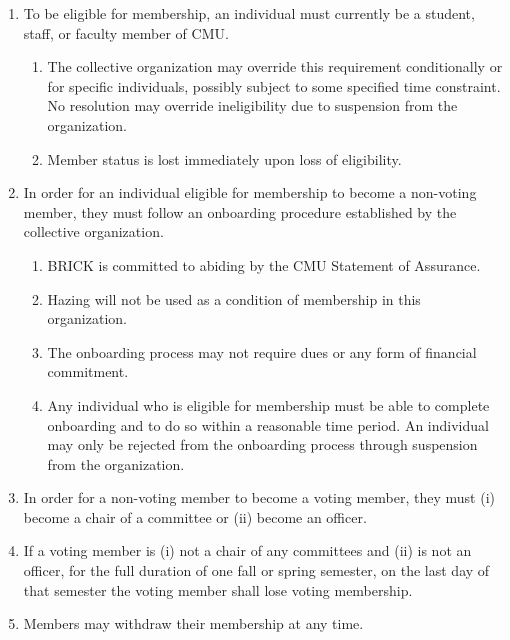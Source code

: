 \documentclass[11pt]{article}
\newcounter{h1}
\newcounter{h2}[h1]
\newcounter{h3}[h2]
\begin{document}
\begin{enumerate}
  \item To be eligible for membership, an individual must currently be a student, staff, or faculty member of CMU.
  \begin{enumerate}
    \item The collective organization may override this requirement conditionally or for specific individuals, possibly subject to some specified time constraint. No resolution may override ineligibility due to suspension from the organization.
    \item Member status is lost immediately upon loss of eligibility.
  \end{enumerate}
  \item In order for an individual eligible for membership to become a non-voting member, they must follow an onboarding procedure established by the collective organization.
  \begin{enumerate}
    \item BRICK is committed to abiding by the CMU Statement of Assurance.
    \item Hazing will not be used as a condition of membership in this organization.
    \item The onboarding process may not require dues or any form of financial commitment.
    \item Any individual who is eligible for membership must be able to complete onboarding and to do so within a reasonable time period. An individual may only be rejected from the onboarding process through suspension from the organization.
  \end{enumerate}
  \item In order for a non-voting member to become a voting member, they must (i) become a chair of a committee or (ii) become an officer.
  \item If a voting member is (i) not a chair of any committees and (ii) is not an officer, for the full duration of one fall or spring semester, on the last day of that semester the voting member shall lose voting membership.
  \item Members may withdraw their membership at any time.
\end{enumerate}

\end{document}
